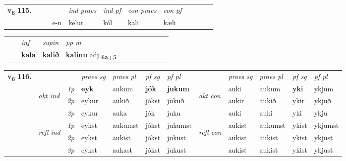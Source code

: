 \begin{tabular}{llllllllllll}\toprule
\multirow{4}{*}{{{\textbf{v{\textsubscript{6}}} \Large{\textbf{115.}}}}}  & &  & &  \textit{ind praes} & \textit{ind pf} & \textit{con praes} & \textit{con pf} \\*
&  & & e-n & kelur & kól & kali & kæli \\*
\cmidrule{5-9}
\end{tabular}


\begin{tabular}{llllllllllll}
 & & \textit{inf}      & \textit{supin}  & \textit{pp m}     \\*
  & & \textbf{kala}       &  \textbf{kalið}  & \textbf{kalinn} adj \textbf{\textsubscript{6a+5}} \\*
\cmidrule{1-12}
\end{tabular}



\begin{tabular}{llllllllllll} \toprule
\multirow{4}{*}{{{\textbf{v{\textsubscript{6}}} \Large{\textbf{116.}}}}}  & &   &  \textit{praes sg}  & \textit{praes pl}  &\textit{ pf sg} & \textit{pf pl} &  &  \textit{praes sg}  & \textit{praes pl}  & \textit{pf sg} & \textit{pf pl } \\*
	\cmidrule{4-7} \cmidrule{9-12}
 & \multirow{3}{*}{\begin{turn}{90}\textit{akt ind}\end{turn}} & {\textit{1p}} & \textbf{eyk} & aukum    & \textbf{jók} & \textbf{jukum} & \multirow{3}{*}{\begin{turn}{90}\textit{akt con}\end{turn}} &auki & aukum & \textbf{yki} & ykjum\\*
& &  {\textit{2p}} &  eykur  & aukið   & jókst & jukuð & & aukir & aukið & ykir & ykjuð \\*
& &  {\textit{3p}} & eykur & auka   & jók & juku & & auki & auki& yki & ykju  \\*
\cmidrule{4-7} \cmidrule{9-12}
 &\multirow{3}{*}{\begin{turn}{90}\textit{refl ind}\end{turn}} & {\textit{1p}} & eykst & aukumst    & jókst & jukumst & \multirow{3}{*}{\begin{turn}{90}\textit{refl con}\end{turn}}  &aukist & aukumst & ykist & ykjumst\\*
 &&  {\textit{2p}} &  eykst  & aukist   & jókst & jukust & &aukist & aukist & ykist & ykjust \\*
& &  {\textit{3p}} & eykst & aukast   & jókst & jukust & & aukist & aukist& ykist & ykjust  \\*
\cmidrule{4-7} \cmidrule{9-12}
\end{tabular}


